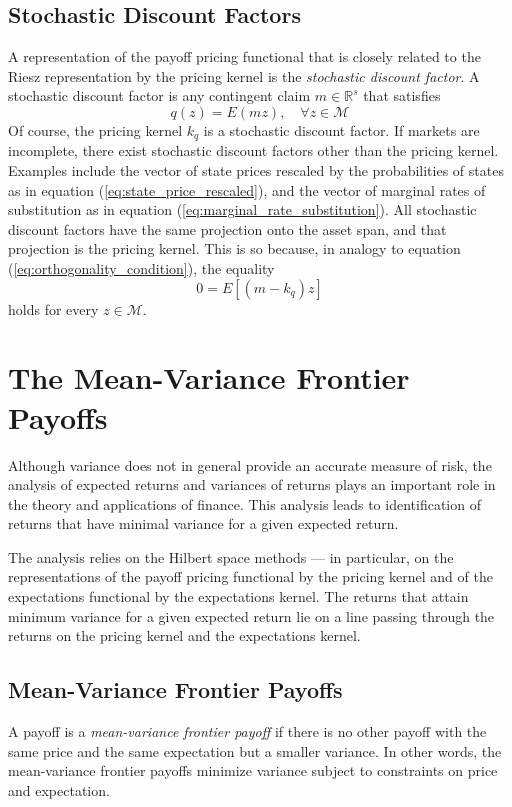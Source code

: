 \documentclass[\topdir/lecture\_notes.tex]{subfiles}
\begin{document}
\subsection{Stochastic Discount Factors}
A representation of the payoff pricing functional that is closely related to the Riesz representation by the pricing kernel is the \emph{stochastic discount factor}. A stochastic discount factor is any contingent claim $m \in \mathbb{R}^{s}$ that satisfies
\begin{equation}
q(z)=E(m z), \quad \forall z \in \mathcal{M} \label{eq:stochastic_discount_factor} 
\end{equation}
Of course, the pricing kernel $k_{q}$ is a stochastic discount factor. If markets are incomplete, there exist stochastic discount factors other than the pricing kernel. Examples include the vector of state prices rescaled by the probabilities of states as in equation (\ref{eq:state_price_rescaled}), and the vector of marginal rates of substitution as in equation (\ref{eq:marginal_rate_substitution}). All stochastic discount factors have the same projection onto the asset span, and that projection is the pricing kernel. This is so because, in analogy to equation (\ref{eq:orthogonality_condition}), the equality
\begin{equation*}
0=E[(m-k_{q}) z] 
\end{equation*}
holds for every $z \in \mathcal{M}$.

\section{The Mean-Variance Frontier Payoffs}
Although variance does not in general provide an accurate measure of risk, the analysis of expected returns and variances of returns plays an important role in the theory and applications of finance. This analysis leads to identification of returns that have minimal variance for a given expected return.

The analysis relies on the Hilbert space methods --- in particular, on the representations of the payoff pricing functional by the pricing kernel and of the expectations functional by the expectations kernel. The returns that attain minimum variance for a given expected return lie on a line passing through the returns on the pricing kernel and the expectations kernel.

\subsection{Mean-Variance Frontier Payoffs}
A payoff is a \emph{mean-variance frontier payoff} if there is no other payoff with the same price and the same expectation but a smaller variance. In other words, the mean-variance frontier payoffs minimize variance subject to constraints on price and expectation.
\end{document}
